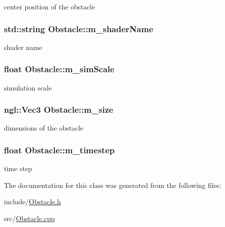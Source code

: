 center position of the obstacle \hypertarget{classObstacle_a83d931c2569ec99d17a483d7b88b2cdf}{
\subsubsection[{m\_\-shaderName}]{\setlength{\rightskip}{0pt plus 5cm}std::string {\bf Obstacle::m\_\-shaderName}}}
\label{classObstacle_a83d931c2569ec99d17a483d7b88b2cdf}


shader name \hypertarget{classObstacle_ae8815e4278c8e141c38e306e89439c57}{
\subsubsection[{m\_\-simScale}]{\setlength{\rightskip}{0pt plus 5cm}float {\bf Obstacle::m\_\-simScale}}}
\label{classObstacle_ae8815e4278c8e141c38e306e89439c57}


simulation scale \hypertarget{classObstacle_a936746fd9203f709367d170255e5ad63}{
\subsubsection[{m\_\-size}]{\setlength{\rightskip}{0pt plus 5cm}ngl::Vec3 {\bf Obstacle::m\_\-size}}}
\label{classObstacle_a936746fd9203f709367d170255e5ad63}


dimensions of the obstacle \hypertarget{classObstacle_a00b57b81521105150839ba7b3846e95b}{
\subsubsection[{m\_\-timestep}]{\setlength{\rightskip}{0pt plus 5cm}float {\bf Obstacle::m\_\-timestep}}}
\label{classObstacle_a00b57b81521105150839ba7b3846e95b}


time step 

The documentation for this class was generated from the following files:\begin{DoxyCompactItemize}
\item 
include/\hyperlink{Obstacle_8h}{Obstacle.h}\item 
src/\hyperlink{Obstacle_8cpp}{Obstacle.cpp}\end{DoxyCompactItemize}
